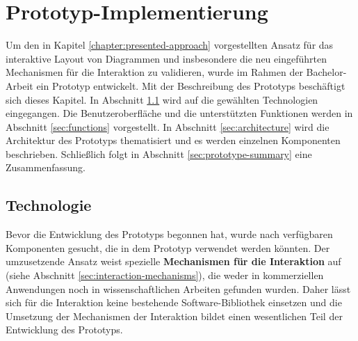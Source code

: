 
\chapter{Prototyp-Implementierung}
\label{chapter:prototype}

Um den in Kapitel \ref{chapter:presented-approach} vorgestellten Ansatz für das interaktive Layout von Diagrammen und insbesondere die neu eingeführten Mechanismen für die Interaktion zu validieren, wurde im Rahmen der Bachelor-Arbeit ein Prototyp entwickelt. Mit der Beschreibung des Prototyps beschäftigt sich dieses Kapitel. In Abschnitt \ref{sec:technologies} wird auf die gewählten Technologien eingegangen. Die Benutzeroberfläche und die unterstützten Funktionen werden in Abschnitt \ref{sec:functions} vorgestellt. In Abschnitt \ref{sec:architecture} wird die Architektur des Prototyps thematisiert und es werden einzelnen Komponenten beschrieben. Schließlich folgt in Abschnitt \ref{sec:prototype-summary} eine Zusammenfassung.

\section{Technologie}
\label{sec:technologies}

Bevor die Entwicklung des Prototyps begonnen hat, wurde nach verfügbaren Komponenten gesucht, die in dem Prototyp verwendet werden könnten. Der umzusetzende Ansatz weist spezielle \textbf{Mechanismen für die Interaktion} auf (siehe Abschnitt \ref{sec:interaction-mechanisms}), die weder in kommerziellen Anwendungen noch in wissenschaftlichen Arbeiten gefunden wurden. Daher lässt sich für die Interaktion keine bestehende Software-Bibliothek einsetzen und die Umsetzung der Mechanismen der Interaktion bildet einen wesentlichen Teil der Entwicklung des Prototyps.

